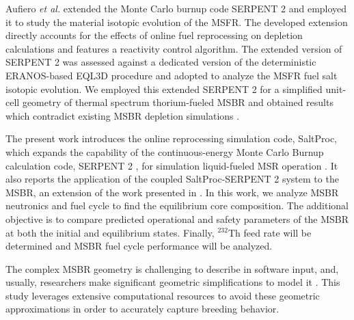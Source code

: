 Aufiero \emph{et al.} extended the Monte Carlo burnup code SERPENT 2 and 
employed it to study the material isotopic evolution of the \gls{MSFR}. The 
developed extension directly accounts for the effects of online fuel 
reprocessing on depletion calculations and features a reactivity control 
algorithm. The extended version of SERPENT 2 was assessed against a dedicated 
version of the deterministic ERANOS-based EQL3D procedure 
\cite{ruggieri_eranos_2006} and adopted to analyze the \gls{MSFR} fuel salt 
isotopic evolution. We employed this extended SERPENT 2 for a simplified 
unit-cell geometry of thermal spectrum thorium-fueled \gls{MSBR} and obtained 
results which contradict existing \gls{MSBR} depletion simulations 
\cite{jeong_equilibrium_2016}.

The present work introduces the online reprocessing simulation code, SaltProc, 
which expands the capability of the continuous-energy Monte Carlo Burnup 
calculation code, SERPENT 2 \cite{leppanen_serpent_2015-1}, for simulation 
liquid-fueled \gls{MSR} operation 
\cite{andrei_rykhlevskii_arfc/saltproc:_2018}. It also reports the 
application of the coupled SaltProc-SERPENT 2 system to the \gls{MSBR}, an 
extension of the work presented in 
\cite{rykhlevskii_full-core_2017, rykhlevskii_online_2017}. In this work, we 
analyze \gls{MSBR} neutronics and fuel cycle to find 
the equilibrium core composition. The additional objective 
is to compare predicted operational and safety parameters of the \gls{MSBR} at 
both the initial and equilibrium states. Finally, $^{232}$Th feed rate will be 
determined and \gls{MSBR} fuel cycle performance will be analyzed.

The complex \gls{MSBR} geometry is challenging to describe in software input, and, 
usually, researchers make significant geometric simplifications to model it 
\cite{park_whole_2015}. This study leverages extensive computational 
resources to avoid these geometric approximations in order to accurately capture 
breeding behavior. 
